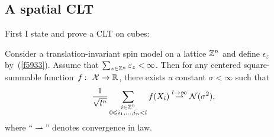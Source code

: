\subsection{A spatial CLT}

First I state and prove a CLT on cubes:
%
\begin{Thm}\label{thm0318}
Consider a translation-invariant spin model on a lattice $\mathbb{Z}^n$
and define $\epsilon_z$ by~(\ref{f5933}).
Assume that $\sum_{z\in\mathbb{Z}^n} \varepsilon_z < \infty$.
Then for any centered square-summable function~$f \colon \mcal{X} \to \RR$,
there exists a constant $\sigma < \infty$ such that
\[\label{f7877}
\frac{1}{\sqrt{l^n}} \sum_{\substack{i\in\mathbb{Z}^n\\0\leqslant i_1,\ldots,i_n<l}} f(X_i)
\stackrel{l\to\infty}{\rightharpoonup} \mathcal{N}(\sigma^2) ,\]
where ``$\rightharpoonup$'' denotes convergence in law.
\end{Thm}

